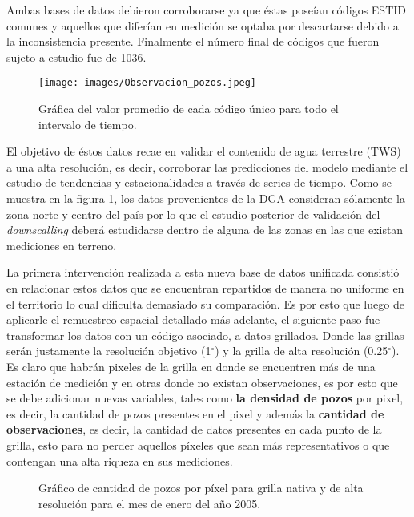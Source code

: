     Ambas bases de datos debieron corroborarse ya que éstas poseían códigos ESTID comunes y aquellos que diferían en medición se optaba por descartarse debido a la inconsistencia presente.
    Finalmente el número final de códigos que fueron sujeto a estudio fue de 1036. 

    \begin{figure}[H]
        \centering
              \texttt{[image: images/Observacion\_pozos.jpeg]}
        \caption[Datos de Pozos DGA sin procesar]{\footnotesize Gráfica del valor promedio de cada código único para todo el intervalo de tiempo.}
        \label{pozosDGA}
    \end{figure}

    El objetivo de éstos datos recae en validar el contenido de agua terrestre (TWS) a una alta resolución, es decir, corroborar las predicciones del modelo mediante el estudio de tendencias y estacionalidades a través de series de tiempo. 
    Como se muestra en la figura \ref{pozosDGA}, los datos provenientes de la DGA consideran sólamente la zona norte y centro del país por lo que el estudio posterior de validación del
    \textit{downscalling} deberá estudidarse dentro de alguna de las zonas en las que existan mediciones en terreno.

    La primera intervención realizada a esta nueva base de datos unificada consistió en relacionar estos datos que se encuentran repartidos de manera no uniforme en el territorio
    lo cual dificulta demasiado su comparación. Es por esto que luego de aplicarle el remuestreo espacial detallado más adelante, el siguiente paso fue transformar los datos con un código asociado,
    a datos grillados. Donde las grillas serán justamente la resolución objetivo (1$^{\circ}$) y la grilla de alta resolución (0.25$^{\circ}$). Es claro que habrán pixeles de la grilla en donde 
    se encuentren más de una estación de medición y en otras donde no existan observaciones, es por esto que se debe adicionar nuevas variables, tales como \textbf{la densidad de pozos} por pixel, es decir, la cantidad de pozos presentes en el pixel y además
    la \textbf{cantidad de observaciones}, es decir, la cantidad de datos presentes en cada punto de la grilla, esto para no perder aquellos píxeles que sean más representativos o que 
    contengan una alta riqueza en sus mediciones.

    \begin{figure}[H]
        \centering
              \goodgap
              \vskip -0.1in
        \caption[Cantidad de pozos en cada grilla]{Gráfico de cantidad de pozos por píxel para grilla nativa y de alta resolución para el mes de enero del año 2005.}
        \label{pixeldepth}
    \end{figure}

